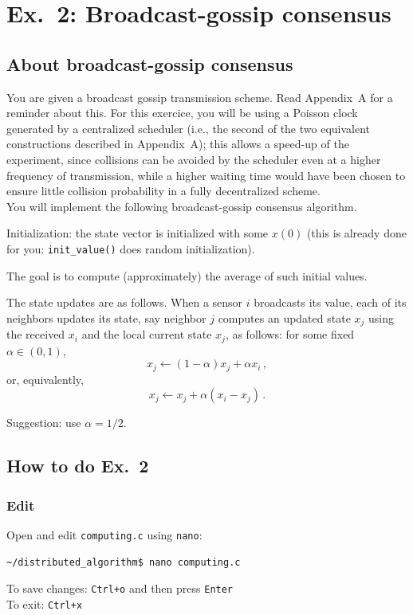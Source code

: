 \documentclass[oneside]{article}
\begin{document}
\section{Ex.~2: Broadcast-gossip consensus}

\subsection{About broadcast-gossip consensus} \label{sec:about-gossip}


You are given a broadcast gossip transmission scheme. Read Appendix~A for a reminder about this.
For this exercice, you will be using a Poisson clock generated by a centralized scheduler (i.e., the second of the two equivalent constructions described in Appendix~A); this allows a speed-up of the experiment, since collisions can be avoided by the scheduler even at a higher frequency of transmission, while a higher waiting time would have been chosen to ensure little collision probability in a fully decentralized scheme.\\

You will implement the following broadcast-gossip consensus algorithm.

Initialization: the state vector is initialized with some $x(0)$ (this is already done for you: \verb=init_value()= does random initialization).

The goal is to compute (approximately) the average of such initial values.

The state updates are as follows. When a sensor $i$ broadcasts its value, each of its neighbors updates its state, say neighbor $j$ computes an updated state $x_j$ using the received $x_i$ and the local current state $x_j$, as follows:
 for some fixed $\alpha \in (0,1)$,
\[ x_j  \leftarrow (1- \alpha) x_j + \alpha x_i \,,\]
 or, equivalently,
\[ x_j \leftarrow x_j + \alpha (x_i-x_j) \,.\]

Suggestion: use $\alpha = 1/2$.

\subsection{How to do Ex.~2}

\subsubsection{Edit}
Open and edit \verb=computing.c= using \verb=nano=:
\begin{verbatim}~/distributed_algorithm$ nano computing.c \end{verbatim}
To save changes: \verb=Ctrl+o= and then press \verb=Enter= \\
To exit: \verb=Ctrl+x=\\
    
\end{document}
